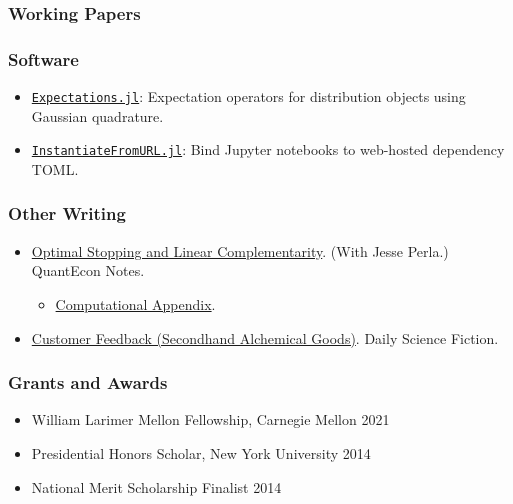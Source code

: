 \documentclass[12pt]{article}   %
\begin{document}
\subsubsection*{Working Papers}
\nocite{NBERw28981}

\hspace*{1.2cm}%
\begin{minipage}{0.9\textwidth}%
  \printbibliography[keyword=workingpaper, heading=none]
\end{minipage}%

\subsubsection*{Software}
\begin{itemize}
  \item \href{https://github.com/QuantEcon/Expectations.jl}{\texttt{Expectations.jl}}: Expectation operators for distribution objects using Gaussian quadrature.
  \item \href{https://github.com/QuantEcon/InstantiateFromURL.jl}{\texttt{InstantiateFromURL.jl}}: Bind Jupyter notebooks to web-hosted dependency TOML.
\end{itemize}

\subsubsection*{Other Writing}
\begin{itemize}
  \item \href{https://notes.quantecon.org/submission/5c832d2be7b4c5000f4c8e48}{Optimal Stopping and Linear Complementarity}. (With Jesse Perla.) QuantEcon Notes.
  \begin{itemize}
    \item \href{https://quantecon.github.io/SimpleDifferentialOperators.jl/v0.4/generated/LCP_advanced.html}{Computational Appendix}.
  \end{itemize}
  \item \href{https://dailysciencefiction.com/fantasy/fantasy/arnav-sood/customer-feedback-secondhand-alchemical-goods}{Customer Feedback (Secondhand Alchemical Goods)}. Daily Science Fiction.
\end{itemize}

\subsubsection*{Grants and Awards}
\begin{itemize}
  \item William Larimer Mellon Fellowship, Carnegie Mellon \hfill 2021
  \item Presidential Honors Scholar, New York University \hfill 2014
  \item National Merit Scholarship Finalist \hfill 2014
\end{itemize}
\end{document}
